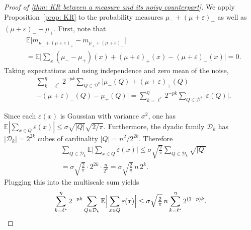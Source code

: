 \documentclass[10pt,a4paper]{amsart}
\begin{document}
\begin{proof}[Proof of \cref{thm: KR between a measure and its noisy counterpart}]



We apply Proposition~\ref{prop: KR} to the probability measures $\mu_-+(\mu+\varepsilon)_+$ as well as $(\mu+\varepsilon)_-+ \mu_+$.  
First, note that 
\begin{align}
    &\mathbb{E} \lvert m_{ \mu_-+(\mu + \varepsilon)_+} - m_{\mu_+ +  (\mu + \varepsilon)_-} \rvert
    \\
    &=\mathbb{E} \bigg\lvert \sum_{x} (\mu_- - \mu_+)(x) + (\mu + \varepsilon)_+(x) - (\mu + \varepsilon)_-(x)\bigg\rvert = 0. \nonumber
\end{align}
Taking expectations and using independence and zero mean of the noise,
\begin{align}
    &\sum_{k=\ell^*}^{\eta}
            2^{-pk}
            \sum _{Q\in \mathcal{D}^k}
            \lvert
                \mu_-(Q)+ (\mu + \varepsilon)_+(Q)
                \\&-(\mu + \varepsilon)_-(Q) - \mu_+(Q)
            \rvert  
            = \sum_{k=\ell^*}^{\eta}
            2^{-pk}
            \sum _{Q\in \mathcal{D}^k}
            \lvert
                 \varepsilon(Q)
            \rvert. \nonumber
\end{align}

Since each $\varepsilon(x)$ is Gaussian with variance $\sigma^2$, one has $\mathbb{E}|\sum_{x\in Q}\varepsilon(x)| \le \sigma \sqrt{|Q|}\sqrt{2/\pi}$. Furthermore, the dyadic family $\mathcal{D}_k$ has $|\mathcal{D}_k|=2^{2k}$ cubes of cardinality $|Q|=n^2/2^{2k}$. Therefore
\begin{align}
    &\sum_{Q\in\mathcal{D}_k} \mathbb{E}\Big| \sum_{x\in Q} \varepsilon(x) \Big|
    \le \sigma \sqrt{\tfrac{2}{\pi}} \sum_{Q\in\mathcal{D}_k} \sqrt{|Q|}
    \\&= \sigma \sqrt{\tfrac{2}{\pi}} \cdot 2^{2k} \cdot \frac{n}{2^{k}}
    = \sigma \sqrt{\tfrac{2}{\pi}}\, n\, 2^{k}. \nonumber
\end{align}
Plugging this into the multiscale sum yields
\begin{equation}
 \sum_{k=\ell^*}^{\eta} 2^{-pk} \sum_{Q\in\mathcal{D}_k} \mathbb{E}\Big| \sum_{x\in Q} \varepsilon(x) \Big|
    \le  \sigma \sqrt{\tfrac{2}{\pi}}\, n \sum_{k=\ell^*}^{\eta} 2^{(1-p)k}. \qedhere
\end{equation}


\end{proof}
\end{document}
